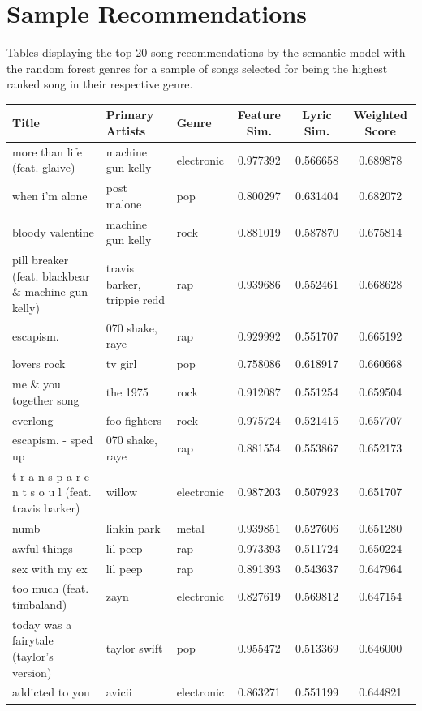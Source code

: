 \documentclass{article}
\begin{document}
\newpage
\section{Sample Recommendations}\label{appendix:recommendations}
Tables displaying the top 20 song recommendations by the semantic model with the random forest genres for a sample of songs selected for being the highest ranked song in their respective genre.

\begin{table}[H]
\centering
\tiny
\begin{tabular}{lll|ccc}
Title & Primary Artists & Genre & Feature Sim. & Lyric Sim. & Weighted Score \\
\hline
more than life (feat. glaive) & machine gun kelly & electronic & 0.977392 & 0.566658 & 0.689878 \\
when i'm alone & post malone & pop & 0.800297 & 0.631404 & 0.682072 \\
bloody valentine & machine gun kelly & rock & 0.881019 & 0.587870 & 0.675814 \\
pill breaker (feat. blackbear \& machine gun kelly) & travis barker, trippie redd & rap & 0.939686 & 0.552461 & 0.668628 \\
escapism. & 070 shake, raye & rap & 0.929992 & 0.551707 & 0.665192 \\
lovers rock & tv girl & pop & 0.758086 & 0.618917 & 0.660668 \\
me \& you together song & the 1975 & rock & 0.912087 & 0.551254 & 0.659504 \\
everlong & foo fighters & rock & 0.975724 & 0.521415 & 0.657707 \\
escapism. - sped up & 070 shake, raye & rap & 0.881554 & 0.553867 & 0.652173 \\
t r a n s p a r e n t s o u l (feat. travis barker) & willow & electronic & 0.987203 & 0.507923 & 0.651707 \\
numb & linkin park & metal & 0.939851 & 0.527606 & 0.651280 \\
awful things & lil peep & rap & 0.973393 & 0.511724 & 0.650224 \\
sex with my ex & lil peep & rap & 0.891393 & 0.543637 & 0.647964 \\
too much (feat. timbaland) & zayn & electronic & 0.827619 & 0.569812 & 0.647154 \\
today was a fairytale (taylor's version) & taylor swift & pop & 0.955472 & 0.513369 & 0.646000 \\
addicted to you & avicii & electronic & 0.863271 & 0.551199 & 0.644821 \\

\end{tabular}
\end{table}
\end{document}
